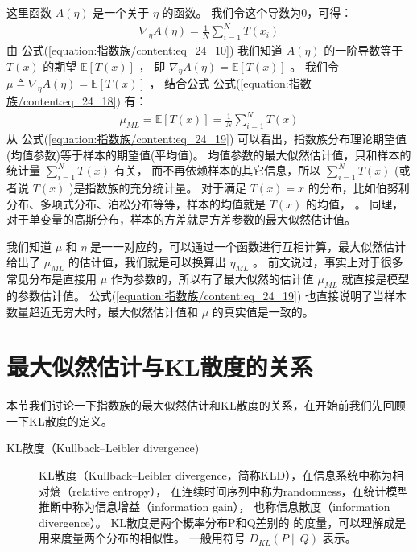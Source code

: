 \documentclass[letterpaper,10pt,english]{sphinxmanual}
\begin{document}
这里函数 \(A(\eta)\) 是一个关于 \(\eta\) 的函数。
我们令这个导数为0，可得：
\begin{equation}\label{equation:指数族/content:eq_24_18}
\begin{split}\nabla_{\eta} A(\eta) = \frac{1}{N} \sum_{i=1}^{N} T(x_i)\end{split}
\end{equation}
由 公式(\ref{equation:指数族/content:eq_24_10}) 我们知道 \(A(\eta)\) 的一阶导数等于 \(T(x)\) 的期望 \(\mathbb{E}[T(x)]\) ，
即 \(\nabla_{\eta} A(\eta)=\mathbb{E}[T(x)]\) 。
我们令 \(\mu \triangleq \nabla_{\eta} A(\eta) =\mathbb{E}[T(x)]\) ，
结合公式 公式(\ref{equation:指数族/content:eq_24_18}) 有：
\begin{equation}\label{equation:指数族/content:eq_24_19}
\begin{split}\mu_{ML}=\mathbb{E}[T(x)] =  \frac{1}{N} \sum_{i=1}^{N} T(x)\end{split}
\end{equation}
从 公式(\ref{equation:指数族/content:eq_24_19}) 可以看出，指数族分布理论期望值(均值参数)等于样本的期望值(平均值)。
均值参数的最大似然估计值，只和样本的统计量 \(\sum_{i=1}^N T(x)\) 有关，
而不再依赖样本的其它信息，所以 \(\sum_{i=1}^N T(x)\) (或者说 \(T(x)\) )是指数族的充分统计量。
对于满足 \(T(x)=x\) 的分布，比如伯努利分布、多项式分布、泊松分布等等，样本的均值就是 \(T(x)\) 的均值，
 。
同理，对于单变量的高斯分布，样本的方差就是方差参数的最大似然估计值。

我们知道 \(\mu\) 和 \(\eta\) 是一一对应的，可以通过一个函数进行互相计算，最大似然估计给出了
\(\mu_{ML}\) 的估计值，我们就是可以换算出 \(\eta_{ML}\) 。
前文说过，事实上对于很多常见分布是直接用 \(\mu\) 作为参数的，所以有了最大似然的估计值 \(\mu_{ML}\)
就直接是模型的参数估计值。
公式(\ref{equation:指数族/content:eq_24_19}) 也直接说明了当样本数量趋近无穷大时，最大似然估计值和 \(\mu\) 的真实值是一致的。


\section{最大似然估计与KL散度的关系}
\label{\detokenize{_u6307_u6570_u65cf/content:kl}}
本节我们讨论一下指数族的最大似然估计和KL散度的关系，在开始前我们先回顾一下KL散度的定义。
\begin{description}
\item[{KL散度（Kullback–Leibler divergence)\label{\detokenize{_u6307_u6570_u65cf/content:term-KL-KullbackLeibler-divergence}}}] \leavevmode
KL散度（Kullback–Leibler divergence，简称KLD），在信息系统中称为相对熵（relative entropy），
在连续时间序列中称为randomness，在统计模型推断中称为信息增益（information gain），
也称信息散度（information divergence）。
KL散度是两个概率分布P和Q差别的  的度量，可以理解成是用来度量两个分布的相似性。
一般用符号 \(D_{KL}(P \parallel Q)\) 表示。

\end{description}
\end{document}
